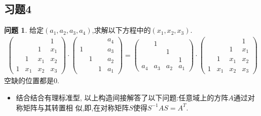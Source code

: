 \documentclass[11pt]{ctexart}
\theoremstyle{definition}
\newtheorem{qqq}{问题}[section]
\numberwithin{equation}{section}
\begin{document}
\subsection{习题4}
\begin{qqq}
    给定$(a_1,a_2,a_3,a_4)$,求解以下方程中的$(x_1,x_2,x_3)$.
    \begin{align}
        \begin{pmatrix}
            &&&1\\ &&1&x_1\\ &1&x_1&x_2\\ 1&x_1&x_2&x_3
        \end{pmatrix}
        \cdot
        \begin{pmatrix}
            &&&a_4\\1&&&a_3\\ & 1&&a_2\\ &&1&a_1
        \end{pmatrix}
        =
        \begin{pmatrix}
            &1&& \\ &&1&\\ &&&1\\a_4&a_3&a_2&a_1
        \end{pmatrix}
        \cdot
        \begin{pmatrix}
            &&&1\\ && 1&x_1\\ & 1&x_1&x_2\\1&x_1&x_2&x_3
        \end{pmatrix}
    \end{align}
    空缺的位置都是0.
    \begin{itemize}
        \item 结合结合有理标准型, 以上构造间接解答了以下问题:任意域上的方阵$A$通过对称矩阵与其转置相
        似,即,在对称矩阵$S$使得$S^{-1}AS=A^T.$
    \end{itemize}
\end{qqq}
\end{document}
